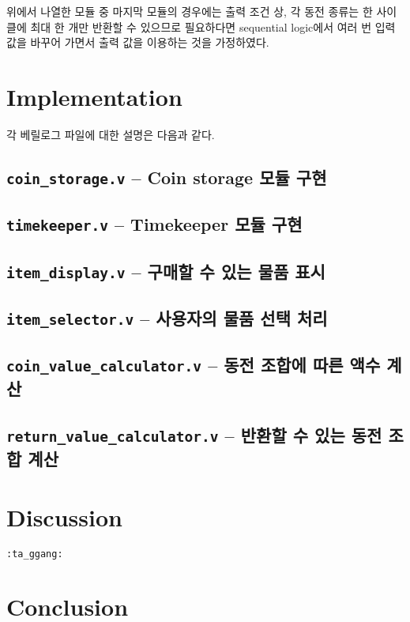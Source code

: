 \documentclass{scrartcl}
\begin{document}
위에서 나열한 모듈 중 마지막 모듈의 경우에는 출력 조건 상, 각 동전 종류는 한 사이클에 최대 한 개만 반환할 수 있으므로 필요하다면
sequential logic에서 여러 번 입력 값을 바꾸어 가면서 출력 값을 이용하는 것을 가정하였다.

\section{Implementation}
각 베릴로그 파일에 대한 설명은 다음과 같다.

\subsection{\texttt{coin\_storage.v} -- Coin storage 모듈 구현}

\subsection{\texttt{timekeeper.v} -- Timekeeper 모듈 구현}

\subsection{\texttt{item\_display.v} -- 구매할 수 있는 물품 표시}

\subsection{\texttt{item\_selector.v} -- 사용자의 물품 선택 처리}

\subsection{\texttt{coin\_value\_calculator.v} -- 동전 조합에 따른 액수 계산}

\subsection{\texttt{return\_value\_calculator.v} -- 반환할 수 있는 동전 조합 계산}

\section{Discussion}
\texttt{:ta\_ggang:} %

\section{Conclusion}
\end{document}
